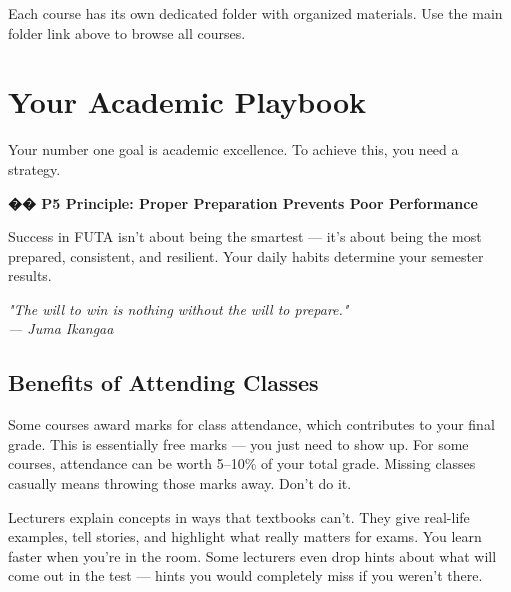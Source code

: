 \documentclass[11pt,a4paper]{article}
\newcommand{\quotetext}[1]{\begin{quotebox}\itshape\color{primary}#1\end{quotebox}}
\begin{document}
Each course has its own dedicated folder with organized materials. Use the main folder link above to browse all courses.



\section{Your Academic Playbook}

Your number one goal is academic excellence. To achieve this, you need a strategy.

\begin{inspirational}
    \textbf{\color{primary}\Large �� P5 Principle: Proper Preparation Prevents Poor Performance}

    \vspace{0.5em}

    Success in FUTA isn't about being the smartest --- it's about being the most prepared, consistent, and resilient. Your daily habits determine your semester results.

    \vspace{0.5em}

    \quotetext{"The will to win is nothing without the will to prepare." \\ --- Juma Ikangaa}
\end{inspirational}

\subsection*{Benefits of Attending Classes}

\begin{tcolorbox}[colback=lightGray,colframe=primary,title={\color{white}\textbf{Attendance Marks}},colbacktitle=primary,arc=4pt,breakable]
Some courses award marks for class attendance, which contributes to your final grade. This is essentially free marks --- you just need to show up. For some courses, attendance can be worth 5--10\% of your total grade. Missing classes casually means throwing those marks away. Don't do it.
\end{tcolorbox}

\begin{tcolorbox}[colback=lightGray,colframe=primary,title={\color{white}\textbf{Better Understanding}},colbacktitle=primary,arc=4pt,breakable]
Lecturers explain concepts in ways that textbooks can't. They give real-life examples, tell stories, and highlight what really matters for exams. You learn faster when you're in the room. Some lecturers even drop hints about what will come out in the test --- hints you would completely miss if you weren't there.
\end{tcolorbox}
\end{document}
